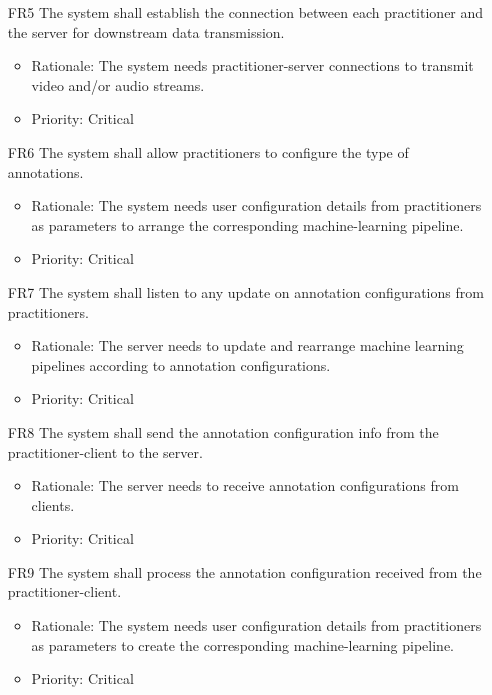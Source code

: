 \documentclass[12pt]{article}
\begin{document}
\begin{itemize}
    \item[FR5] The system shall establish the connection between each practitioner and the server for downstream data transmission. \label{FR5}
    \begin{itemize}
        \item Rationale: The system needs practitioner-server connections to transmit video and/or audio streams.
        \item Priority: Critical
    \end{itemize}
\end{itemize}
\begin{itemize}
    \item[FR6] The system shall allow practitioners to configure the type of annotations. \label{FR6}
    \begin{itemize}
        \item Rationale: The system needs user configuration details from practitioners as parameters to arrange the corresponding machine-learning pipeline.
        \item Priority: Critical
    \end{itemize}
\end{itemize}
\begin{itemize}
    \item[FR7] The system shall listen to any update on annotation configurations from practitioners. \label{FR7}
    \begin{itemize}
        \item Rationale: The server needs to update and rearrange machine learning pipelines according to annotation configurations.
        \item Priority: Critical
    \end{itemize}
\end{itemize}
\begin{itemize}
    \item[FR8] The system shall send the annotation configuration info from the practitioner-client to the server. \label{FR8}
    \begin{itemize}
        \item Rationale: The server needs to receive annotation configurations from clients.
        \item Priority: Critical
    \end{itemize}
\end{itemize}
\begin{itemize}
    \item[FR9] The system shall process the annotation configuration received from the practitioner-client. \label{FR9}
    \begin{itemize}
        \item Rationale: The system needs user configuration details from practitioners as parameters to create the corresponding machine-learning pipeline.
        \item Priority: Critical
    \end{itemize}
\end{itemize}
\end{document}
